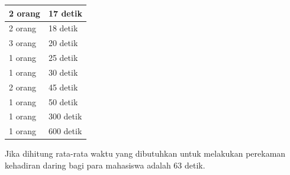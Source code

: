 \begin{enumerate}
\begin{table}[ht]
\begin{tabular}{|p{4cm} |p{7cm}|}
			2 orang &  17 detik\\ \hline 
			2 orang &  18 detik\\ \hline 
			3 orang &  20 detik\\ \hline
			1 orang &  25 detik\\ \hline 
			1 orang &  30 detik\\ \hline 
			2 orang &  45 detik\\ \hline
			1 orang &  50 detik\\ \hline 
			1 orang &  300 detik\\ \hline 
			1 orang &  600 detik\\ \hline		
		\end{tabular}
		\label{tab:daringMahasiswa}
	\end{table}
	Jika dihitung rata-rata waktu yang dibutuhkan untuk melakukan perekaman kehadiran daring bagi para mahasiswa adalah 63 detik.
	

\end{enumerate}

